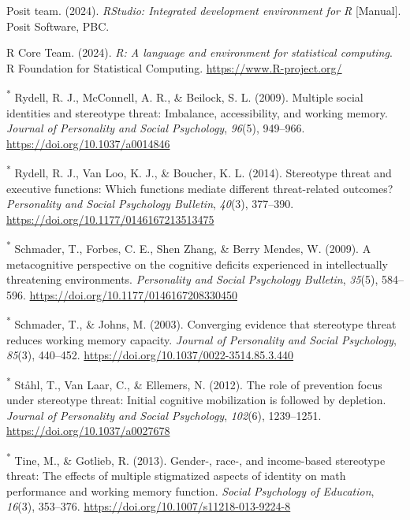 \documentclass[
  stu, a4paper,floatsintext]{apa7}
\newlength{\cslhangindent}
\newenvironment{CSLReferences}[2] %
 {\begin{list}{}{%
  \setlength{\itemindent}{0pt}
  \setlength{\leftmargin}{0pt}
  \setlength{\parsep}{0pt}
  \ifodd #1
   \setlength{\leftmargin}{\cslhangindent}
   \setlength{\itemindent}{-1\cslhangindent}
  \fi
  \setlength{\itemsep}{#2\baselineskip}}}
 {\end{list}}
\begin{document}
\begin{CSLReferences}{1}{0}
Posit team. (2024). \emph{{RStudio}: {Integrated} development environment for {R}} {[}Manual{]}. Posit Software, PBC.

R Core Team. (2024). \emph{R: A language and environment for statistical computing}. R Foundation for Statistical Computing. \url{https://www.R-project.org/}

\textsuperscript{*} Rydell, R. J., McConnell, A. R., \& Beilock, S. L. (2009). Multiple social identities and stereotype threat: {Imbalance}, accessibility, and working memory. \emph{Journal of Personality and Social Psychology}, \emph{96}(5), 949--966. \url{https://doi.org/10.1037/a0014846}

\textsuperscript{*} Rydell, R. J., Van Loo, K. J., \& Boucher, K. L. (2014). Stereotype threat and executive functions: {Which} functions mediate different threat-related outcomes? \emph{Personality and Social Psychology Bulletin}, \emph{40}(3), 377--390. \url{https://doi.org/10.1177/0146167213513475}

\textsuperscript{*} Schmader, T., Forbes, C. E., Shen Zhang, \& Berry Mendes, W. (2009). A metacognitive perspective on the cognitive deficits experienced in intellectually threatening environments. \emph{Personality and Social Psychology Bulletin}, \emph{35}(5), 584--596. \url{https://doi.org/10.1177/0146167208330450}

\textsuperscript{*} Schmader, T., \& Johns, M. (2003). Converging evidence that stereotype threat reduces working memory capacity. \emph{Journal of Personality and Social Psychology}, \emph{85}(3), 440--452. \url{https://doi.org/10.1037/0022-3514.85.3.440}

\textsuperscript{*} Ståhl, T., Van Laar, C., \& Ellemers, N. (2012). The role of prevention focus under stereotype threat: {Initial} cognitive mobilization is followed by depletion. \emph{Journal of Personality and Social Psychology}, \emph{102}(6), 1239--1251. \url{https://doi.org/10.1037/a0027678}

\textsuperscript{*} Tine, M., \& Gotlieb, R. (2013). Gender-, race-, and income-based stereotype threat: The effects of multiple stigmatized aspects of identity on math performance and working memory function. \emph{Social Psychology of Education}, \emph{16}(3), 353--376. \url{https://doi.org/10.1007/s11218-013-9224-8}


\end{CSLReferences}
\end{document}
